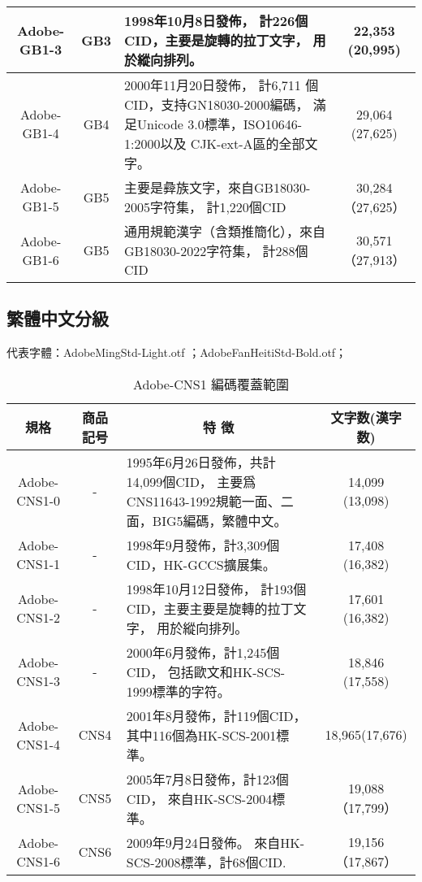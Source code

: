 \begin{appendix}
\begin{table}[h]
\begin{tabular}{|c|c|p{8cm}|c|}
Adobe-GB1-3	& GB3	&   1998年10月8日發佈，
計226個CID，主要是旋轉的拉丁文字，
用於縱向排列。 & 22,353 (20,995) \\

\hline
Adobe-GB1-4	& GB4 & 2000年11月20日發佈，
計6,711 個CID，支持GN18030-2000編碼，
滿足Unicode 3.0標準，ISO10646-1:2000以及 CJK-ext-A區的全部文字。
& 29,064 (27,625) \\
\hline
Adobe-GB1-5	& GB5 & 主要是彜族文字，來自GB18030-2005字符集，
計1,220個CID & 30,284（27,625） \\
\hline
Adobe-GB1-6	& GB5 & 通用規範漢字（含類推簡化），來自GB18030-2022字符集，
計288個CID & 30,571（27,913） \\

\hline %
\end{tabular}

\end{table}

\subsection{繁體中文分級}
{\gtfamily 代表字體：AdobeMingStd-Light.otf ；AdobeFanHeitiStd-Bold.otf；}
\begin{table}[h]
\caption{\fontsize{12pt}{15pt}\selectfont Adobe-CNS1 編碼覆蓋範圍} %
\centering %
\begin{tabular}{|c|c|p{8cm}|c|}%
\hline  %

規格 & 商品記号	& \multicolumn{1}{|c|}{特 徴} & 文字数(漢字数) \\

\hline  %
Adobe-CNS1-0 &	-	 & 1995年6月26日發佈，共計14,099個CID，
主要爲CNS11643-1992規範一面、二面，BIG5編碼，繁體中文。
& 14,099 (13,098) \\
\hline
Adobe-CNS1-1	& - &	1998年9月發佈，計3,309個CID，HK-GCCS擴展集。
& 	17,408 (16,382) \\
\hline
Adobe-CNS1-2	& - &  1998年10月12日發佈，
計193個CID，主要主要是旋轉的拉丁文字，
用於縱向排列。 & 17,601 (16,382) \\
\hline

Adobe-CNS1-3	& -	&   2000年6月發佈，計1,245個CID，
包括歐文和HK-SCS-1999標準的字符。
&  18,846 (17,558) \\

\hline
Adobe-CNS1-4	& CNS4 & 2001年8月發佈，計119個CID，
其中116個為HK-SCS-2001標準。
& 18,965(17,676) \\
\hline
Adobe-CNS1-5	& CNS5 & 2005年7月8日發佈，計123個CID，
來自HK-SCS-2004標準。 & 19,088（17,799） \\
\hline
Adobe-CNS1-6	& CNS6 & 2009年9月24日發佈。
來自HK-SCS-2008標準，計68個CID. & 19,156（17,867） \\
\hline %
\end{tabular}

\end{table}

\end{appendix}